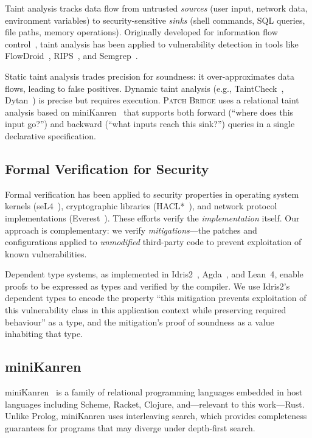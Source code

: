 \documentclass[11pt,twocolumn]{article}
\begin{document}
Taint analysis tracks data flow from untrusted \emph{sources}
(user input, network data, environment variables) to security-sensitive
\emph{sinks} (shell commands, SQL queries, file paths, memory
operations). Originally developed for information flow
control~\cite{denning1976lattice, myers1999jflow}, taint analysis has
been applied to vulnerability detection in tools like
FlowDroid~\cite{flowdroid}, RIPS~\cite{rips}, and
Semgrep~\cite{semgrep}.

Static taint analysis trades precision for soundness: it
over-approximates data flows, leading to false positives. Dynamic taint
analysis (e.g., TaintCheck~\cite{taintcheck}, Dytan~\cite{dytan})
is precise but requires execution. \textsc{Patch Bridge} uses a
relational taint analysis based on miniKanren~\cite{byrd2017minikanren,
friedman2005reasoned} that supports both forward (``where does this
input go?'') and backward (``what inputs reach this sink?'') queries
in a single declarative specification.

\subsection{Formal Verification for Security}
\label{sec:bg-formal}

Formal verification has been applied to security properties in operating
system kernels (seL4~\cite{sel4}), cryptographic
libraries (HACL*~\cite{hacl-star}), and network protocol
implementations (Everest~\cite{everest}). These efforts verify the
\emph{implementation} itself. Our approach is complementary: we verify
\emph{mitigations}---the patches and configurations applied to
\emph{unmodified} third-party code to prevent exploitation of known
vulnerabilities.

Dependent type systems, as implemented in Idris2~\cite{idris2},
Agda~\cite{agda}, and Lean~4\cite{lean4}, enable proofs to be expressed
as types and verified by the compiler. We use Idris2's dependent types
to encode the property ``this mitigation prevents exploitation of this
vulnerability class in this application context while preserving
required behaviour'' as a type, and the mitigation's proof of soundness
as a value inhabiting that type.

\subsection{miniKanren}
\label{sec:bg-minikanren}

miniKanren~\cite{byrd2017minikanren, friedman2005reasoned} is a family
of relational programming languages embedded in host languages including
Scheme, Racket, Clojure, and---relevant to this work---Rust. Unlike
Prolog, miniKanren uses interleaving search, which provides completeness
guarantees for programs that may diverge under depth-first search.
\end{document}
